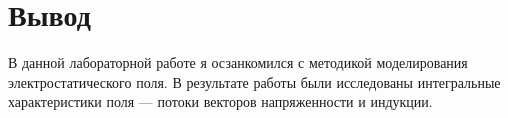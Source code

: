 \section*{Вывод}

В данной лабораторной работе я осзанкомился с методикой моделирования электростатического поля. 
В результате работы были исследованы интегральные характеристики поля ---
потоки векторов
напряженности и индукции.